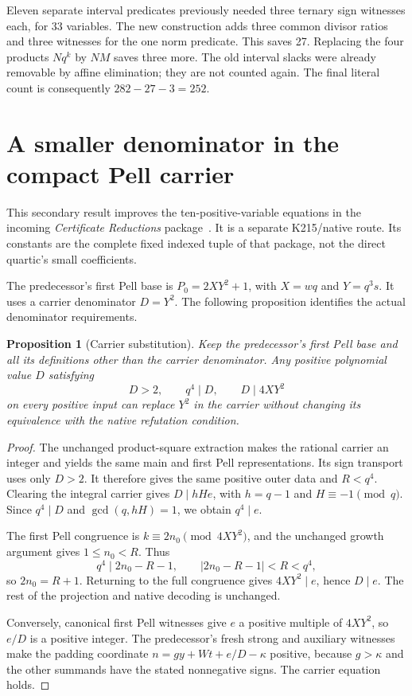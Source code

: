 \documentclass[11pt,letterpaper]{article}
\newtheorem{proposition}[theorem]{Proposition}
\theoremstyle{remark}\newtheorem{remark}[theorem]{Remark}
\begin{document}
Eleven separate interval predicates previously needed three ternary sign
witnesses each, for 33 variables. The new construction adds three common
divisor ratios and three witnesses for the one norm predicate. This
saves 27. Replacing the four products $Nq^k$ by $NM$ saves three more.
The old interval slacks were already removable by affine elimination;
they are not counted again. The final literal count is consequently
$282-27-3=252$.

\section{A smaller denominator in the compact Pell carrier}\label{sec:carrier}

This secondary result improves the ten-positive-variable equations in the
incoming \emph{Certificate Reductions} package~\cite{certreductions}.
It is a separate K215/native route. Its constants are the complete fixed
indexed tuple of that package, not the direct quartic's small coefficients.

The predecessor's first Pell base is $P_0=2XY^2+1$, with
$X=wq$ and $Y=q^3s$. It uses a carrier denominator $D=Y^2$.
The following proposition identifies the actual denominator requirements.

\begin{proposition}[Carrier substitution]\label{prop:carrier}
Keep the predecessor's first Pell base and all its definitions other than
the carrier denominator. Any positive polynomial value $D$ satisfying
\[
 D>2,\qquad q^4\mid D,\qquad D\mid4XY^2
\]
on every positive input can replace $Y^2$ in the carrier without changing
its equivalence with the native refutation condition.
\end{proposition}
\begin{proof}
The unchanged product-square extraction makes the rational carrier an
integer and yields the same main and first Pell representations. Its sign
transport uses only $D>2$. It therefore gives the same positive outer
data and $R<q^4$. Clearing the integral carrier gives
$D\mid hHe$, with $h=q-1$ and $H\equiv-1\pmod q$.
Since $q^4\mid D$ and $\gcd(q,hH)=1$, we obtain $q^4\mid e$.

The first Pell congruence is $k\equiv2n_0\pmod{4XY^2}$, and the
unchanged growth argument gives $1\le n_0<R$. Thus
\[
 q^4\mid2n_0-R-1,\qquad |2n_0-R-1|<R<q^4,
\]
so $2n_0=R+1$. Returning to the full congruence gives
$4XY^2\mid e$, hence $D\mid e$. The rest of the projection and
native decoding is unchanged.

Conversely, canonical first Pell witnesses give $e$ a positive multiple
of $4XY^2$, so $e/D$ is a positive integer. The predecessor's fresh
strong and auxiliary witnesses make the padding coordinate
$n=gy+Wt+e/D-\kappa$ positive, because $g>\kappa$ and the other
summands have the stated nonnegative signs. The carrier equation holds.
\end{proof}
\end{document}
